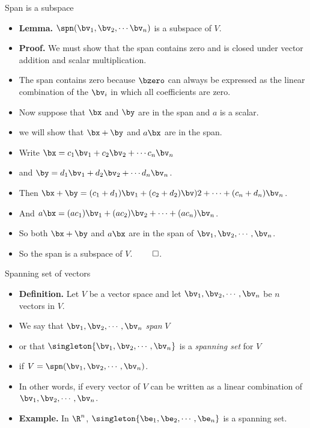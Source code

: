 \documentclass{beamer}
\begin{document}
\begin{frame}{Span is a subspace}

\begin{itemize}
\item \textbf{Lemma.} $\spn(\bv_1,\bv_2,\cdots\bv_n)$ is a subspace of $V$.
\item \textbf{Proof.} We must show that the span contains zero and is closed under vector addition
and scalar multiplication.
\item The span contains zero because $\bzero$ can always be expressed as the linear combination
of the $\bv_i$ in which all coefficients are zero.
\item Now suppose that $\bx$ and $\by$ are in the span and $a$ is a scalar.
\item we will show that $\bx+\by$ and $a \bx$ are in the span.
\item Write $\bx = c_1\bv_1 + c_2\bv_2 + \cdots c_n \bv_n$
\item and $\by = d_1\bv_1 + d_2\bv_2 + \cdots d_n \bv_n$.
\item Then $\bx + \by = (c_1 + d_1) \bv_1 + (c_2 +d_2)\bv)2 + \cdots + (c_n+d_n)\bv_n$.
\item And $a\bx = (ac_1)\bv_1 + (ac_2)\bv_2 + \cdots + (ac_n)\bv_n$.
\item So both $\bx+\by$ and $a\bx$ are in the span of $\bv_1,\bv_2,\cdots,\bv_n$.
\item So the span is a subspace of $V$. $\qed$.
\end{itemize}
\end{frame}

\begin{frame}{Spanning set of vectors}

\begin{itemize}
\item \textbf{Definition.} Let $V$ be a vector space and let $\bv_1,\bv_2,\cdots,\bv_n$ be $n$ vectors in $V$.
\item We say that $\bv_1,\bv_2,\cdots,\bv_n$ \emph{span} $V$
\item or that $\singleton{\bv_1,\bv_2,\cdots,\bv_n}$ is a \emph{spanning set} for $V$
\item if $V=\spn(\bv_1,\bv_2,\cdots,\bv_n)$.
\item In other words, if every vector of $V$ can be written as a linear combination of
 $\bv_1,\bv_2,\cdots,\bv_n$.
 \item \textbf{Example.} In $\R^n$, $\singleton{\be_1,\be_2,\cdots,\be_n}$ is a
 spanning set.
\end{itemize}

\end{frame}
\end{document}

